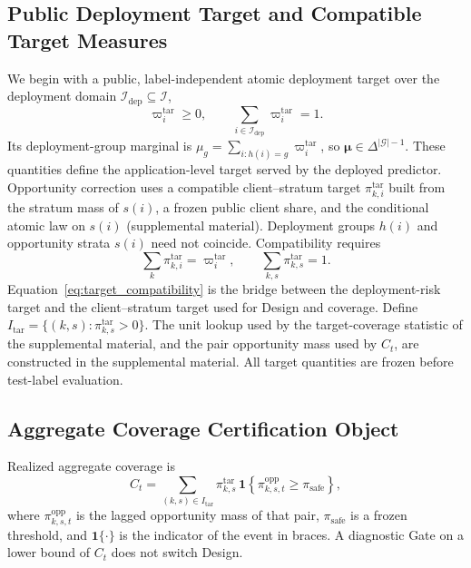 \documentclass[letterpaper,journal]{IEEEtran}
\begin{document}
\subsection{Public Deployment Target and Compatible Target Measures}
\label{subsec:target_measures}

We begin with a public, label-independent atomic deployment target over the
deployment domain $\mathcal{I}_{\mathrm{dep}}\subseteq\mathcal{I}$,
\begin{equation}
    \varpi_i^{\mathrm{tar}}\ge0,
    \qquad
    \sum_{i\in\mathcal{I}_{\mathrm{dep}}}
    \varpi_i^{\mathrm{tar}}=1.
    \label{eq:atomic_target}
\end{equation}
Its deployment-group marginal is
$\mu_g=\sum_{i:h(i)=g}\varpi_i^{\mathrm{tar}}$, so
$\boldsymbol{\mu}\in\Delta^{|\mathcal{G}|-1}$.
These quantities define the application-level target served by the deployed
predictor.  Opportunity correction uses a compatible client--stratum target
$\pi^{\mathrm{tar}}_{k,i}$ built from the stratum mass of $s(i)$, a frozen
public client share, and the conditional atomic law on $s(i)$
(supplemental material).  Deployment groups $h(i)$ and opportunity strata
$s(i)$ need not coincide.  Compatibility requires
\begin{equation}
    \sum_k\pi^{\mathrm{tar}}_{k,i}
    =
    \varpi_i^{\mathrm{tar}},
    \qquad
    \sum_{k,s}\pi^{\mathrm{tar}}_{k,s}=1.
    \label{eq:target_compatibility}
\end{equation}
Equation~\eqref{eq:target_compatibility} is the bridge between the
deployment-risk target and the client--stratum target used for Design
and coverage.  Define $I_{\mathrm{tar}}=\{(k,s):\pi^{\mathrm{tar}}_{k,s}>0\}$.
The unit lookup used by the target-coverage statistic of the supplemental
material, and the pair opportunity mass used by
$C_t$, are constructed in the supplemental material.
All target quantities are frozen before test-label evaluation.

\subsection{Aggregate Coverage Certification Object}
\label{subsec:agg_coverage_object}

Realized aggregate coverage is
\begin{equation}
 C_t
 =
 \sum_{(k,s)\in I_{\mathrm{tar}}}
 \pi^{\mathrm{tar}}_{k,s}
 \,
 \mathbf{1}\!\left\{\pi^{\mathrm{opp}}_{k,s,t}\ge\pi_{\mathrm{safe}}\right\},
 \label{eq:agg_Ct}
\end{equation}
where $\pi^{\mathrm{opp}}_{k,s,t}$ is the lagged opportunity mass of
that pair, $\pi_{\mathrm{safe}}$ is a frozen threshold, and
$\mathbf{1}\{\cdot\}$ is the indicator of the event in braces.
A diagnostic Gate on a lower bound of $C_t$ does not switch Design.
\end{document}
